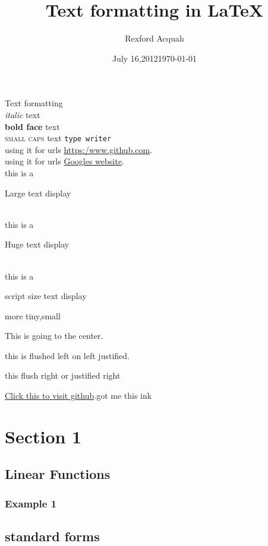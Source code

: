 \documentclass[14pt]{article}
\title{Text formatting in \LaTeX}
\author{Rexford Acquah}
\date{July 16,2012}
\date{\today}
\begin{document}
	\tableofcontents
	\maketitle
	
	
	Text formatting\\
	\textit{italic} text\\
	\textbf{bold face} text\\
	\textsc{small caps} text
	\texttt{type writer}\\
	
	using it for urls \url{https:/www.github.com}.\\
	\vspace{1in}
	using it for urls \href{https:/www.google.com}{Googles website}.\\
	this is a \begin{Large}
	Large text display
	\end{Large}
	\\
	this is a \begin{Huge}
		Huge text display
	\end{Huge}
		\\
	this is a \begin{scriptsize}
		script size text display
	\end{scriptsize}
	more tiny,small
	\\
	\begin{center}
		This is going to the center.
	\end{center}
	\begin{flushleft}
		this is flushed left on left justified.
	\end{flushleft}
	
	\begin{flushright}
		this flush right or justified right
	\end{flushright}
	 \href{https:www.github.com}{Click this to visit github}.got me this ink
	
	
	\section{Section 1}
		\subsection{Linear Functions}
			\subsubsection{Example 1}
		\subsection{standard forms}
		
\end{document}

